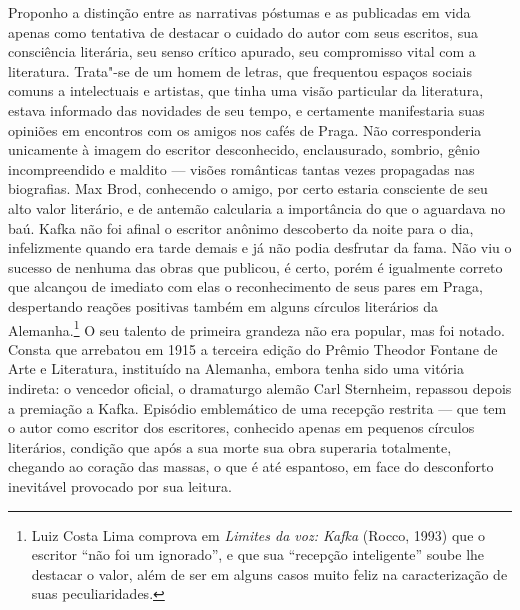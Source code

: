 Proponho a distinção entre as narrativas póstumas e as publicadas em
vida apenas como tentativa de destacar o cuidado do autor com seus
escritos, sua consciência literária, seu senso crítico apurado, seu
compromisso vital com a literatura. Trata"-se de um homem de letras,
que frequentou espaços sociais comuns a intelectuais e artistas, que
tinha uma visão particular da literatura, estava informado das
novidades de seu tempo, e certamente manifestaria suas opiniões em
encontros com os amigos nos cafés de Praga. Não corresponderia
unicamente à imagem do escritor desconhecido, enclausurado, sombrio,
gênio incompreendido e maldito --- visões românticas tantas vezes
propagadas nas biografias. Max Brod, conhecendo o amigo, por certo
estaria consciente de seu alto valor literário, e de antemão calcularia
a importância do que o aguardava no baú. Kafka não foi afinal o
escritor anônimo descoberto da noite para o dia, infelizmente quando
era tarde demais e já não podia desfrutar da fama. Não viu o sucesso de
nenhuma das obras que publicou, é certo, porém é igualmente correto que
alcançou de imediato com elas o reconhecimento de seus pares em Praga,
despertando reações positivas também em alguns círculos literários da
Alemanha.\footnote{ Luiz Costa Lima comprova em \textit{Limites da voz:
Kafka} (Rocco, 1993) que o escritor “não foi um
ignorado”, e que sua “recepção inteligente” soube lhe destacar o valor,
além de ser em alguns casos muito feliz na caracterização de suas
peculiaridades.} O seu talento de primeira grandeza não era popular, mas
foi notado. Consta que arrebatou em 1915 a terceira edição do Prêmio
Theodor Fontane de Arte e Literatura, instituído na Alemanha, embora
tenha sido uma vitória indireta: o vencedor oficial, o dramaturgo
alemão Carl Sternheim, repassou depois a premiação a Kafka. Episódio
emblemático de uma recepção restrita --- que tem o autor como escritor dos
escritores, conhecido apenas em pequenos círculos literários, condição
que após a sua morte sua obra superaria totalmente, chegando ao coração
das massas, o que é até espantoso, em face do desconforto inevitável
provocado por sua leitura.

